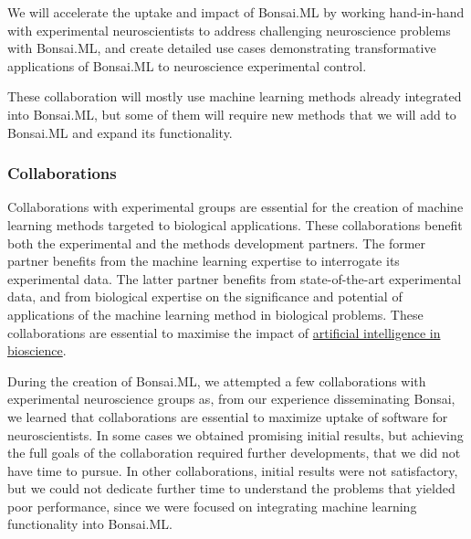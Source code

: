 
We will accelerate the uptake and impact of Bonsai.ML by working hand-in-hand
with experimental neuroscientists to address challenging neuroscience problems
with Bonsai.ML, and create detailed use cases demonstrating transformative
applications of Bonsai.ML to neuroscience experimental control.
%

These collaboration will mostly use machine learning methods already integrated
into Bonsai.ML, but some of them will require new methods that we will add to
Bonsai.ML and expand its functionality.

\subsubsection{Collaborations}

Collaborations with experimental groups are essential for the creation of
machine learning methods targeted to biological applications. These
collaborations benefit both the experimental and the methods development
partners.
%
The former partner benefits from the machine learning expertise to interrogate its experimental data.
%
The latter partner benefits from state-of-the-art experimental
data, and from biological expertise on the significance and potential of applications of
the machine learning method in biological problems.
%
These collaborations are essential to maximise the impact of
\href{https://www.ukri.org/what-we-do/browse-our-areas-of-investment-and-support/artificial-intelligence-in-bioscience/}{artificial
intelligence in bioscience}.

During the creation of Bonsai.ML, we attempted a few collaborations with
experimental neuroscience groups as, from our experience disseminating Bonsai,
we learned that collaborations are essential to maximize uptake of software for
neuroscientists.
%
In some cases we obtained promising initial results, but achieving the full
goals of the collaboration required further developments, that we did not have
time to pursue.
%
In other collaborations, initial results were not satisfactory, but we could
not dedicate further time to understand the problems that yielded poor
performance, since we were focused on integrating machine learning
functionality into Bonsai.ML.

